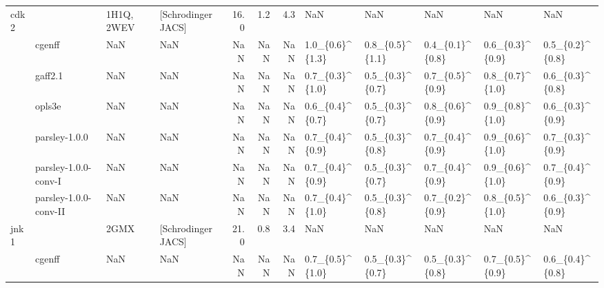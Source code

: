 \begin{tabular}{llllrrrlllll}
cdk2 &                       &  1H1Q, 2WEV &  [Schrodinger JACS] &        16.0 &      1.2 &            4.3 &              NaN &              NaN &              NaN &                NaN &               NaN \\
     & cgenff &         NaN &                 NaN &         NaN &      NaN &            NaN &  1.0\_\{0.6\}\textasciicircum \{1.3\} &  0.8\_\{0.5\}\textasciicircum \{1.1\} &  0.4\_\{0.1\}\textasciicircum \{0.8\} &    0.6\_\{0.3\}\textasciicircum \{0.9\} &   0.5\_\{0.2\}\textasciicircum \{0.8\} \\
     & gaff2.1 &         NaN &                 NaN &         NaN &      NaN &            NaN &  0.7\_\{0.3\}\textasciicircum \{1.0\} &  0.5\_\{0.3\}\textasciicircum \{0.7\} &  0.7\_\{0.5\}\textasciicircum \{0.9\} &    0.8\_\{0.7\}\textasciicircum \{1.0\} &   0.6\_\{0.3\}\textasciicircum \{0.8\} \\
     & opls3e &         NaN &                 NaN &         NaN &      NaN &            NaN &  0.6\_\{0.4\}\textasciicircum \{0.7\} &  0.5\_\{0.3\}\textasciicircum \{0.7\} &  0.8\_\{0.6\}\textasciicircum \{0.9\} &    0.9\_\{0.8\}\textasciicircum \{1.0\} &   0.6\_\{0.3\}\textasciicircum \{0.9\} \\
     & parsley-1.0.0 &         NaN &                 NaN &         NaN &      NaN &            NaN &  0.7\_\{0.4\}\textasciicircum \{0.9\} &  0.5\_\{0.3\}\textasciicircum \{0.8\} &  0.7\_\{0.4\}\textasciicircum \{0.9\} &    0.9\_\{0.6\}\textasciicircum \{1.0\} &   0.7\_\{0.3\}\textasciicircum \{0.9\} \\
     & parsley-1.0.0-conv-I &         NaN &                 NaN &         NaN &      NaN &            NaN &  0.7\_\{0.4\}\textasciicircum \{0.9\} &  0.5\_\{0.3\}\textasciicircum \{0.7\} &  0.7\_\{0.4\}\textasciicircum \{0.9\} &    0.9\_\{0.6\}\textasciicircum \{1.0\} &   0.7\_\{0.4\}\textasciicircum \{0.9\} \\
     & parsley-1.0.0-conv-II &         NaN &                 NaN &         NaN &      NaN &            NaN &  0.7\_\{0.4\}\textasciicircum \{1.0\} &  0.5\_\{0.3\}\textasciicircum \{0.8\} &  0.7\_\{0.2\}\textasciicircum \{0.9\} &    0.8\_\{0.5\}\textasciicircum \{1.0\} &   0.6\_\{0.3\}\textasciicircum \{0.9\} \\
jnk1 &                       &        2GMX &  [Schrodinger JACS] &        21.0 &      0.8 &            3.4 &              NaN &              NaN &              NaN &                NaN &               NaN \\
     & cgenff &         NaN &                 NaN &         NaN &      NaN &            NaN &  0.7\_\{0.5\}\textasciicircum \{1.0\} &  0.5\_\{0.3\}\textasciicircum \{0.7\} &  0.5\_\{0.3\}\textasciicircum \{0.8\} &    0.7\_\{0.5\}\textasciicircum \{0.9\} &   0.6\_\{0.4\}\textasciicircum \{0.8\} \\

\end{tabular}
